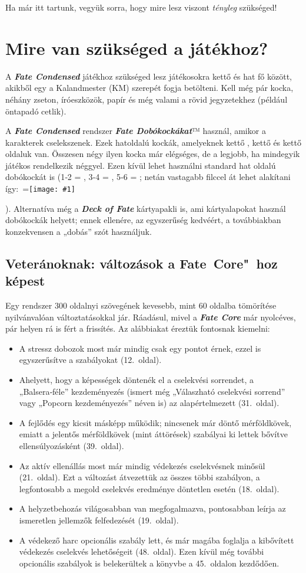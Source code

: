 \documentclass[oneside]{book}
\newcommand{\fate}[1]{\textbf{\textit{#1}}}
\newcommand{\page}[1]{#1.~oldal}
\newcommand{\onpage}[1]{#1.~oldalon}
\newcommand{\vcenteredinclude}[1]{\begingroup\setbox0=\hbox{\texttt{[image: \#1]}}\parbox{\wd0}{\box0}\endgroup}
\begin{document}
Ha már itt tartunk, vegyük sorra, hogy mire lesz viszont \emph{tényleg} szükséged!

\section{Mire van szükséged a játékhoz?}

A \fate{Fate Condensed} játékhoz szükséged lesz játékosokra kettő és hat fő között, akikből egy a Kalandmester (KM) szerepét fogja betölteni. Kell még pár kocka, néhány zseton, íróeszközök, papír és még valami a rövid jegyzetekhez (például öntapadó cetlik).

A \fate{Fate Condensed} rendszer \fate{Fate Dobókockákat}™ használ, amikor a karakterek cselekszenek. Ezek hatoldalú kockák, amelyeknek kettő , kettő \dice{+} és kettő \dice{-} oldaluk van. Összesen négy ilyen kocka már elégséges, de a legjobb, ha mindegyik játékos rendelkezik néggyel. Ezen kívül lehet használni standard hat oldalú dobókockát is (1‑2 = \dice{-}, 3‑4 = , 5‑6 = \dice{+}; netán vastagabb filccel át lehet alakítani így:~\vcenteredinclude{d6_to_fudge_v2.png}). Alternatíva még a \fate{Deck of Fate} kártyapakli is, ami kártyalapokat használ dobókockák helyett; ennek ellenére, az egyszerűség kedvéért, a továbbiakban konzekvensen a „dobás” szót használjuk.

\subsection{Veteránoknak: változások a Fate~Core"~hoz képest}

Egy rendszer 300 oldalnyi szövegének kevesebb, mint 60 oldalba tömörítése nyilvánvalóan változtatásokkal jár. Ráadásul, mivel a \fate{Fate Core} már nyolcéves, pár helyen rá is fért a frissítés. Az alábbiakat éreztük fontosnak kiemelni:
\begin{itemize}
    \item A stressz dobozok most már mindig csak egy pontot érnek, ezzel is egyszerűsítve a szabályokat (\page{12}).
    \item Ahelyett, hogy a képességek döntenék el a cselekvési sorrendet, a „Balsera‑féle” kezdeményezés (ismert még „Válaszható cselekvési sorrend” vagy „Popcorn kezdeményezés” néven is) az alapértelmezett (\page{31}).
    \item A fejlődés egy kicsit másképp működik; nincsenek már döntő mérföldkövek, emiatt a jelentős mérföldkövek (mint áttörések) szabályai ki lettek bővítve ellensúlyozásként (\page{39}).
    \item Az aktív ellenállás most már mindig védekezés cselekvésnek minősül (\page{21}). Ezt a változást átvezettük az összes többi szabályon, a legfontosabb a megold cselekvés eredménye döntetlen esetén (\page{18}).
    \item A helyzetbehozás világosabban van megfogalmazva, pontosabban leírja az ismeretlen jellemzők felfedezését (\page{19}).
    \item A védekező harc opcionális szabály lett, és már magába foglalja a kibővített védekezés cselekvés lehetőségeit (\page{48}). Ezen kívül még további opcionális szabályok is belekerültek a könyvbe a \onpage{45} kezdődően.
\end{itemize}
\end{document}
